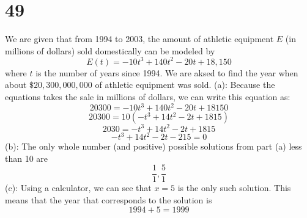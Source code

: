 \documentclass{article}
\theoremstyle{definition}
\begin{document}
\section*{49}
We are given that from 1994 to 2003, the amount of athletic equipment $E$ (in millions of dollars) sold domestically can be modeled by
\[ E(t)=-10t^3+140t^2-20t+18,150 \]
where $t$ is the number of years since 1994. We are aksed to find the year when about $\$20,300,000,000$ of athletic equipment 
was sold.\newline
(a): Because the equations takes the sale in millions of dollars, we can write this equation as:
\[ 20300=-10t^3+140t^2-20t+18150 \]
\[ 20300=10(-t^3+14t^2-2t+1815) \]
\[ 2030=-t^3+14t^2-2t+1815 \]
\[ -t^3+14t^2-2t-215=0 \]
(b): The only whole number (and positive) possible solutions from part (a) less than 10 are \[ \frac{1}{1},\frac{5}{1} \]
(c): Using a calculator, we can see that $x=5$ is the only such solution. This means that the year that corresponds to the solution is 
\[ 1994+5=1999 \] 
\end{document}
